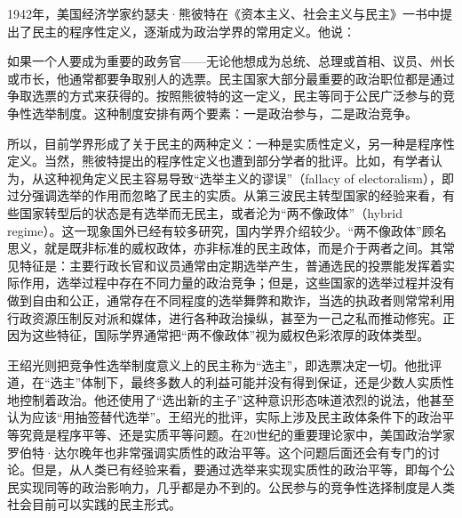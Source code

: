 1942年，美国经济学家约瑟夫·熊彼特在《资本主义、社会主义与民主》一书中提出了民主的程序性定义，逐渐成为政治学界的常用定义。他说：


如果一个人要成为重要的政务官——无论他想成为总统、总理或首相、议员、州长或市长，他通常都要争取别人的选票。民主国家大部分最重要的政治职位都是通过争取选票的方式来获得的。按照熊彼特的这一定义，民主等同于公民广泛参与的竞争性选举制度。这种制度安排有两个要素：一是政治参与，二是政治竞争。

所以，目前学界形成了关于民主的两种定义：一种是实质性定义，另一种是程序性定义。当然，熊彼特提出的程序性定义也遭到部分学者的批评。比如，有学者认为，从这种视角定义民主容易导致“选举主义的谬误”（fallacy of electoralism），即过分强调选举的作用而忽略了民主的实质。从第三波民主转型国家的经验来看，有些国家转型后的状态是有选举而无民主，或者沦为“两不像政体”（hybrid regime）。这一现象国外已经有较多研究，国内学界介绍较少。“两不像政体”顾名思义，就是既非标准的威权政体，亦非标准的民主政体，而是介于两者之间。其常见特征是：主要行政长官和议员通常由定期选举产生，普通选民的投票能发挥着实际作用，选举过程中存在不同力量的政治竞争；但是，这些国家的选举过程并没有做到自由和公正，通常存在不同程度的选举舞弊和欺诈，当选的执政者则常常利用行政资源压制反对派和媒体，进行各种政治操纵，甚至为一己之私而推动修宪。正因为这些特征，国际学界通常把“两不像政体”视为威权色彩浓厚的政体类型。

王绍光则把竞争性选举制度意义上的民主称为“选主”，即选票决定一切。他批评道，在“选主”体制下，最终多数人的利益可能并没有得到保证，还是少数人实质性地控制着政治。他还使用了“选出新的主子”这种意识形态味道浓烈的说法，他甚至认为应该“用抽签替代选举”。王绍光的批评，实际上涉及民主政体条件下的政治平等究竟是程序平等、还是实质平等问题。在20世纪的重要理论家中，美国政治学家罗伯特·达尔晚年也非常强调实质性的政治平等。这个问题后面还会有专门的讨论。但是，从人类已有经验来看，要通过选举来实现实质性的政治平等，即每个公民实现同等的政治影响力，几乎都是办不到的。公民参与的竞争性选择制度是人类社会目前可以实践的民主形式。

